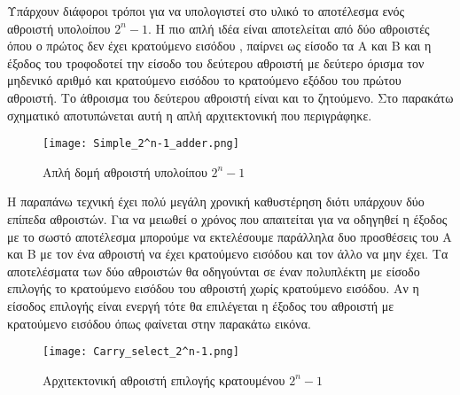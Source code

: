 Υπάρχουν διάφοροι τρόποι για να υπολογιστεί στο υλικό το αποτέλεσμα 
ενός αθροιστή υπολοίπου $2^n-1$.
Η πιο απλή ιδέα είναι αποτελείται από δύο αθροιστές όπου ο πρώτος δεν έχει
κρατούμενο εισόδου , παίρνει ως είσοδο τα Α και Β και η έξοδος του τροφοδοτεί
την είσοδο του δεύτερου αθροιστή με δεύτερο όρισμα τον μηδενικό αριθμό
και κρατούμενο εισόδου το κρατούμενο εξόδου του πρώτου αθροιστή. Το άθροισμα 
του δεύτερου αθροιστή είναι και το ζητούμενο. Στο παρακάτω σχηματικό αποτυπώνεται
αυτή η απλή αρχιτεκτονική που περιγράφηκε.
\begin{figure}[H]
\centering
\texttt{[image: Simple\_2^n-1\_adder.png]}
\caption{Απλή δομή αθροιστή υπολοίπου $2^n-1$}
\label{fig:2^n-1_simple_adder}
\end{figure}
Η παραπάνω τεχνική έχει πολύ μεγάλη χρονική καθυστέρηση διότι υπάρχουν δύο 
επίπεδα αθροιστών. Για να μειωθεί ο χρόνος που απαιτείται για να οδηγηθεί η έξοδος
με το σωστό αποτέλεσμα μπορούμε να εκτελέσουμε παράλληλα δυο προσθέσεις του Α και Β
με τον ένα αθροιστή να έχει κρατούμενο εισόδου και τον άλλο να μην έχει. Τα αποτελέσματα 
των δύο αθροιστών θα οδηγούνται σε έναν πολυπλέκτη με είσοδο επιλογής το κρατούμενο 
εισόδου του αθροιστή χωρίς κρατούμενο εισόδου. Αν η είσοδος επιλογής είναι ενεργή 
τότε θα επιλέγεται η έξοδος του αθροιστή με κρατούμενο εισόδου όπως φαίνεται στην 
παρακάτω εικόνα.
\begin{figure}[H]
\centering
\texttt{[image: Carry\_select\_2^n-1.png]}
\caption{Αρχιτεκτονική αθροιστή επιλογής κρατουμένου $2^n-1$}
\label{fig:2^n-1_carry_select_adder}
\end{figure}

















